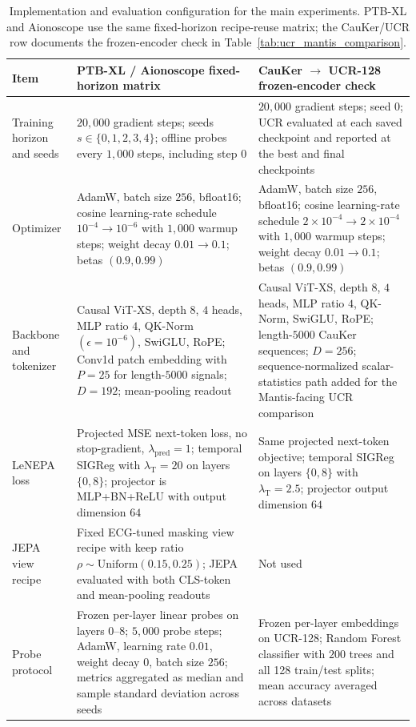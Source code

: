 \documentclass[sigconf,anonymous,review]{acmart}
\begin{document}
\begin{table}[t]
\centering
\scriptsize
\caption{Implementation and evaluation configuration for the main experiments. PTB-XL and Aionoscope use the same fixed-horizon recipe-reuse matrix; the CauKer/UCR row documents the frozen-encoder check in Table~\ref{tab:ucr_mantis_comparison}.}
\label{tab:reproducibility_config}
\setlength{\tabcolsep}{3pt}
\begin{tabularx}{\textwidth}{p{} X X}
\toprule
Item & PTB-XL / Aionoscope fixed-horizon matrix & CauKer $\rightarrow$ UCR-128 frozen-encoder check \\
\midrule
Training horizon and seeds
& $20{,}000$ gradient steps; seeds $s\in\{0,1,2,3,4\}$; offline probes every $1{,}000$ steps, including step $0$
& $20{,}000$ gradient steps; seed $0$; UCR evaluated at each saved checkpoint and reported at the best and final checkpoints \\
Optimizer
& AdamW, batch size $256$, bfloat16; cosine learning-rate schedule $10^{-4}\rightarrow10^{-6}$ with $1{,}000$ warmup steps; weight decay $0.01\rightarrow0.1$; betas $(0.9,0.99)$
& AdamW, batch size $256$, bfloat16; cosine learning-rate schedule $2{\times}10^{-4}\rightarrow2{\times}10^{-4}$ with $1{,}000$ warmup steps; weight decay $0.01\rightarrow0.1$; betas $(0.9,0.99)$ \\
Backbone and tokenizer
& Causal ViT-XS, depth $8$, $4$ heads, MLP ratio $4$, QK-Norm $(\epsilon=10^{-6})$, SwiGLU, RoPE; Conv1d patch embedding with $P=25$ for length-$5000$ signals; $D=192$; mean-pooling readout
& Causal ViT-XS, depth $8$, $4$ heads, MLP ratio $4$, QK-Norm, SwiGLU, RoPE; length-$5000$ CauKer sequences; $D=256$; sequence-normalized scalar-statistics path added for the Mantis-facing UCR comparison \\
LeNEPA loss
& Projected MSE next-token loss, no stop-gradient, $\lambda_{\mathrm{pred}}=1$; temporal SIGReg with $\lambda_{\mathrm{T}}=20$ on layers $\{0,8\}$; projector is MLP+BN+ReLU with output dimension $64$
& Same projected next-token objective; temporal SIGReg on layers $\{0,8\}$ with $\lambda_{\mathrm{T}}=2.5$; projector output dimension $64$ \\
JEPA view recipe
& Fixed ECG-tuned masking view recipe with keep ratio $\rho\sim\mathrm{Uniform}(0.15,0.25)$; JEPA evaluated with both CLS-token and mean-pooling readouts
& Not used \\
Probe protocol
& Frozen per-layer linear probes on layers $0$--$8$; $5{,}000$ probe steps; AdamW, learning rate $0.01$, weight decay $0$, batch size $256$; metrics aggregated as median and sample standard deviation across seeds
& Frozen per-layer embeddings on UCR-128; Random Forest classifier with $200$ trees and all 128 train/test splits; mean accuracy averaged across datasets \\
\bottomrule
\end{tabularx}
\end{table}
\end{document}
